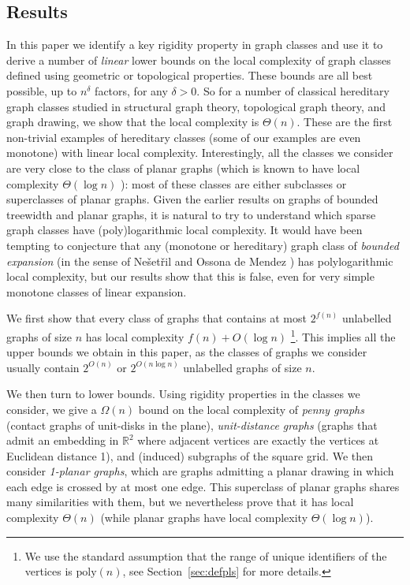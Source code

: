 \documentclass[a4paper,reqno, 12pt]{amsart}
\begin{document}
\subsection*{Results}

In this paper we
identify a key rigidity property  in graph classes and use it to
derive a number of \emph{linear} lower bounds on the local complexity of graph classes defined using geometric or topological
properties. These bounds are all best possible, up to $n^{\delta}$
factors, for any $\delta>0$. So 
for a number of classical hereditary
graph classes
studied in structural graph theory, topological graph theory,  and
graph drawing, we show that the local complexity is
$\Theta(n)$. These are the first non-trivial examples of hereditary
classes (some of our examples are even monotone) with linear local
complexity. Interestingly, all the classes we consider are very close
to the class of planar graphs (which is known to have local complexity
$\Theta(\log n)$ \cite{planar,EL}): most of
these classes are either subclasses or superclasses of planar
graphs. Given the earlier results on graphs of bounded
treewidth \cite{tw} and planar graphs, it is natural to try to understand
which sparse graph classes have (poly)logarithmic local complexity. It
would have been tempting to conjecture that any (monotone or
hereditary) graph class of \emph{bounded expansion} (in the sense of
Ne\v set\v ril and Ossona de Mendez \cite{NO})  has polylogarithmic
local complexity, but our results show that this is false, even for very
simple monotone classes of linear expansion.

\medskip

We first show that every class of graphs that contains
at most $2^{f(n)}$ unlabelled graphs of size $n$ has local complexity
$f(n)+O(\log n)$ \footnote{We use the standard assumption that the
  range of unique identifiers of the vertices is $\text{poly}(n)$, see
Section~\ref{sec:defpls} for more details.}. This implies all the upper
bounds we obtain in this paper, as the
classes of graphs we consider usually contain $2^{O(n)}$ or $2^{O(n
  \log n)}$ unlabelled graphs of size $n$.

\medskip

We then turn to lower bounds.
Using rigidity properties in the classes we consider, we give a
$\Omega(n)$ bound on the local
complexity of \emph{penny graphs} (contact
graphs of unit-disks in the plane), \emph{unit-distance graphs}
(graphs that admit an embedding in $\mathbb{R}^2$ where adjacent vertices
are exactly the vertices at Euclidean distance 1), and
(induced) subgraphs of the square grid.
We then consider \emph{1-planar graphs}, which are graphs
admitting a planar drawing in which each edge is crossed by at most
one edge. This superclass of
planar graphs shares many
similarities with them, but we nevertheless prove that it has local
complexity $\Theta(n)$ (while planar graphs have local complexity
$\Theta(\log n)$).
\end{document}
